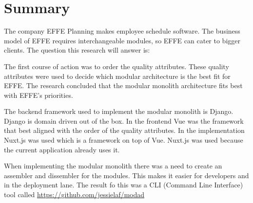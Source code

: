 \chapter{Summary}

The company EFFE Planning makes employee schedule software. The business model of EFFE requires interchangeable modules, so EFFE can cater to bigger clients.
The question this research will answer is:


The first course of action was to order the quality attributes. These quality attributes were used to decide which modular architecture is the best fit for EFFE. The research concluded that the modular monolith architecture fits best with EFFE's priorities.

The backend framework used to implement the modular monolith is Django. Django is domain driven out of the box. In the frontend Vue was the framework that best aligned with the order of the quality attributes. In the implementation Nuxt.js was used which is a framework on top of Vue. Nuxt.js was used because the current application already uses it.

When implementing the modular monolith there was a need to create an assembler and dissembler for the modules. This makes it easier for developers and in the deployment lane. The result fo this was a CLI (Command Line Interface) tool called \href{modad}{https://github.com/jessielaf/modad}
